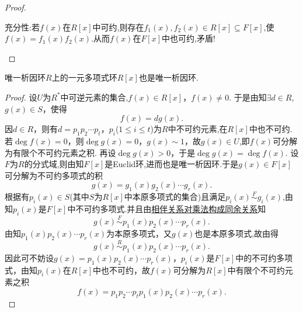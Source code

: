 \documentclass[../../main.tex]{subfiles}%
\begin{document}
\begin{proof}
\begin{enumerate}[(1)]
{\heiti 充分性:}若$f(x)$在$R[x]$中可约,则存在$f_1(x),f_2(x)\in R[x]\subseteq F[x]$,使$f(x)=f_1(x)f_2(x)$.从而$f(x)$在$F[x]$中也可约,矛盾!
\end{enumerate}
\end{proof}

\begin{theorem}\label{theorem:抽象代数--定理2.7.3}
唯一析因环$R$上的一元多项式环$R[x]$也是唯一析因环.
\end{theorem}
\begin{proof}
设$U$为$R^*$中可逆元素的集合,$f(x) \in R[x]$，$f(x) \neq 0$. 于是由知$\exists d \in R$,$g(x) \in S$，使得
\[
f(x) = dg(x).
\]
因$d \in R$，则有$d = p_1p_2\cdots p_t$，$p_i$($1 \leqslant i \leqslant t$)为$R$中不可约元素,在$R[x]$中也不可约. 若$\deg f(x) = 0$，则$\deg g(x) = 0$，$g(x) \sim 1$，故$g(x)\in U$,即$f(x)$可分解为有限个不可约元素之积. 再设$\deg g(x) > 0$，于是$\deg g(x) = \deg f(x)$. 设$F$为$R$的分式域,则由知$F[x]$是Euclid环,进而也是唯一析因环.于是$g(x) \in F[x]$可分解为不可约多项式的积
\[
g(x) = g_1(x)g_2(x)\cdots g_r(x).
\]
根据有$p_i(x) \in S$(其中$S$为$R[x]$中本原多项式的集合)且满足$p_i(x) \stackrel{F}{\sim} g_i(x)$,由知$p_i(x)$是$F[x]$中不可约多项式.并且由\hyperref[theorem:单位群整除的基本性质-8]{相伴关系对乘法构成同余关系}知
\[
g(x) \stackrel{F}{\sim} p_1(x)p_2(x)\cdots p_r(x).
\]
由知$p_1(x)p_2(x)\cdots p_r(x)$为本原多项式，又$g(x)$也是本原多项式,故由得
\[
g(x) \stackrel{R}{\sim} p_1(x)p_2(x)\cdots p_r(x).
\]
因此可不妨设$g(x) = p_1(x)p_2(x)\cdots p_r(x)$，$p_i(x)$是$F[x]$中的不可约多项式，由知$p_i(x)$在$R[x]$中也不可约，故$f(x)$可分解为$R[x]$中有限个不可约元素之积
\[
f(x) = p_1p_2\cdots p_tp_1(x)p_2(x)\cdots p_r(x).
\]


\end{proof}
\end{document}
